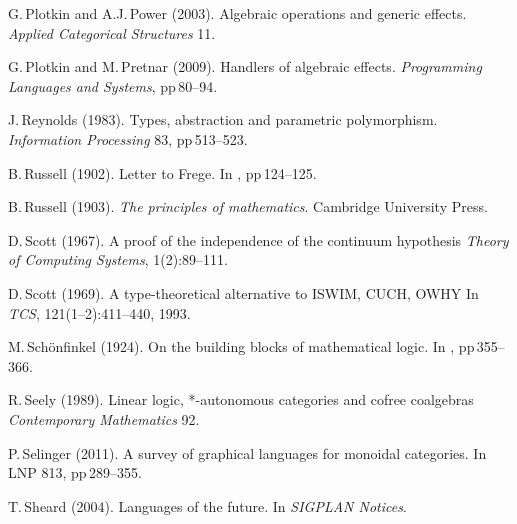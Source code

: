\documentclass[11pt,twocolumn]{article}
\begin{document}
{\begin{thebibliography}{000}
G.\,Plotkin and A.J.\,Power (2003).
\newblock Algebraic operations and generic effects.
\newblock \emph{Applied Categorical Structures} 11.

G.\,Plotkin and M.\,Pretnar (2009).
\newblock Handlers of algebraic effects.
\newblock \emph{Programming Languages and Systems}, pp\,80--94.


J.\,Reynolds (1983).
\newblock Types, abstraction and parametric polymorphism.
\newblock \emph{Information Processing} 83, pp\,513--523.


B.\,Russell (1902).
\newblock Letter to Frege. 
\newblock In \emph{\cite{vanHeijenoort}}, pp\,124--125. 

B.\,Russell (1903).
\newblock \emph{The principles of mathematics}.
\newblock Cambridge University Press. 

D.\,Scott (1967).
\newblock A proof of the independence of the continuum hypothesis
\newblock \emph{Theory of Computing Systems}, 1(2):89--111.

D.\,Scott (1969).
\newblock A type-theoretical alternative to ISWIM, CUCH, OWHY
\newblock In \emph{TCS}, 121(1--2):411--440, 1993.

M.\,Sch\"{o}nfinkel (1924).
\newblock On the building blocks of mathematical logic.
\newblock In \emph{\cite{vanHeijenoort}}, pp\,355--366.

R.\,Seely (1989).
\newblock Linear logic, *-autonomous categories and cofree coalgebras 
\newblock \emph{Contemporary Mathematics} 92. 

P.\,Selinger (2011).
\newblock A survey of graphical languages for monoidal categories.
\newblock In LNP 813, pp\,289--355. 

T.\,Sheard (2004).
\newblock Languages of the future.
\newblock In \emph{SIGPLAN Notices}.


\end{thebibliography}}
\end{document}
